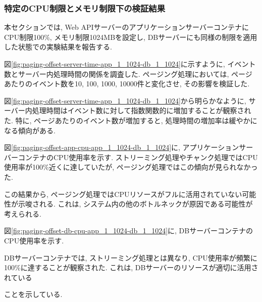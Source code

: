 \documentclass[../../../../main]{subfiles}
\begin{document}
    \subsubsection{特定のCPU制限とメモリ制限下の検証結果}\label{subsubsec:result-paging-offset-only-limit}

    本セクションでは, Web APIサーバーのアプリケーションサーバーコンテナにCPU制限100\%, メモリ制限1024MBを設定し, DBサーバーにも同様の制限を適用した状態での実験結果を報告する.

    \label{subsubsubsec:result-paging-offset-only-limit-server-time}

    図\ref{fig:paging-offset-server-time-app_1_1024-db_1_1024}に示すように, イベント数とサーバー内処理時間の関係を調査した. ページング処理においては, ページあたりのイベント数を10, 100, 1000, 10000件と変化させ, その影響を検証した.

    

    図\ref{fig:paging-offset-server-time-app_1_1024-db_1_1024}から明らかなように, サーバー内処理時間はイベント数に対して指数関数的に増加することが観察された. 特に, ページあたりのイベント数が増加すると, 処理時間の増加率は緩やかになる傾向がある.

    \label{subsubsubsec:result-paging-offset-only-limit-cpu}

    図\ref{fig:paging-offset-app-cpu-app_1_1024-db_1_1024}に, アプリケーションサーバーコンテナのCPU使用率を示す. ストリーミング処理やチャンク処理ではCPU使用率が100\%近くに達していたが, ページング処理ではこの傾向が見られなかった.

    

    この結果から, ページング処理ではCPUリソースがフルに活用されていない可能性が示唆される. これは, システム内の他のボトルネックが原因である可能性が考えられる.

    図\ref{fig:paging-offset-db-cpu-app_1_1024-db_1_1024}に, DBサーバーコンテナのCPU使用率を示す.

    

    DBサーバーコンテナでは, ストリーミング処理とは異なり, CPU使用率が頻繁に100\%に達することが観察された. これは, DBサーバーのリソースが適切に活用されている

    ことを示している.

    \label{subsubsubsec:result-paging-offset-only-limit-mem}
\end{document}
